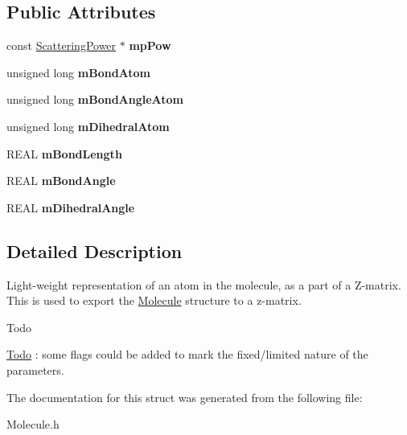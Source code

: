 \subsection*{Public Attributes}
\begin{DoxyCompactItemize}
\item 
\mbox{\label{struct_obj_cryst_1_1_mol_z_atom_a84763284b4efc30c91be13265e905475}} 
const \mbox{\hyperlink{class_obj_cryst_1_1_scattering_power}{Scattering\+Power}} $\ast$ {\bfseries mp\+Pow}
\item 
\mbox{\label{struct_obj_cryst_1_1_mol_z_atom_a0e756b0230126d63f2a7b2a13cc1689c}} 
unsigned long {\bfseries m\+Bond\+Atom}
\item 
\mbox{\label{struct_obj_cryst_1_1_mol_z_atom_a9e30bfb98a0ca6c57b9eb3de01a3f263}} 
unsigned long {\bfseries m\+Bond\+Angle\+Atom}
\item 
\mbox{\label{struct_obj_cryst_1_1_mol_z_atom_a8499371cdbeb7afd5e2e62fbc2a143b5}} 
unsigned long {\bfseries m\+Dihedral\+Atom}
\item 
\mbox{\label{struct_obj_cryst_1_1_mol_z_atom_a4910c978b6e16302ab25abb31275b6e8}} 
R\+E\+AL {\bfseries m\+Bond\+Length}
\item 
\mbox{\label{struct_obj_cryst_1_1_mol_z_atom_a978590d76e45ae341e9d5fea680c1cc3}} 
R\+E\+AL {\bfseries m\+Bond\+Angle}
\item 
\mbox{\label{struct_obj_cryst_1_1_mol_z_atom_af33360b883b663c71d1ec79e4f68c169}} 
R\+E\+AL {\bfseries m\+Dihedral\+Angle}
\end{DoxyCompactItemize}


\subsection{Detailed Description}
Light-\/weight representation of an atom in the molecule, as a part of a Z-\/matrix. This is used to export the \mbox{\hyperlink{class_obj_cryst_1_1_molecule}{Molecule}} structure to a z-\/matrix.

\begin{DoxyRefDesc}{Todo}
\item[\mbox{\hyperlink{todo__todo000004}{Todo}}]\+: some flags could be added to mark the fixed/limited nature of the parameters. \end{DoxyRefDesc}


The documentation for this struct was generated from the following file\+:\begin{DoxyCompactItemize}
\item 
Molecule.\+h\end{DoxyCompactItemize}
